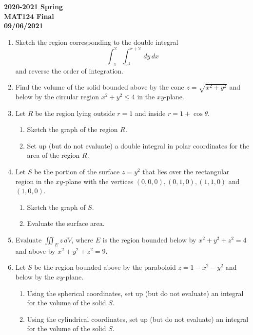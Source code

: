 \documentclass[a4paper, 12pt]{article}
\begin{document}
\newpage
{}
{}

\begin{center}
\textbf{2020-2021 Spring \\MAT124 Final\\09/06/2021}
\end{center}

\begin{enumerate}[leftmargin=*,label=\textbf{\arabic*.}]
\item Sketch the region corresponding to the double integral
\[\int_{-1}^2\int_{x^2}^{x+2}\,dy\,dx\]
and reverse the order of integration.

\item Find the volume of the solid bounded above by the cone $z=\sqrt{x^2+y^2}$ and below by the circular region $x^2+y^2\leq4$ in the $xy$-plane.

\item Let $R$ be the region lying outside $r=1$ and inside $r=1+\cos\theta$.
\begin{enumerate}[leftmargin=*,label=\textbf{\alph*.}]
\item Sketch the graph of the region $R$.
\item Set up (but do not evaluate) a double integral in polar coordinates for the area of the region $R$.
\end{enumerate}

\item Let $S$ be the portion of the surface $z=y^2$ that lies over the rectangular region in the $xy$-plane with the vertices $(0,0,0), (0,1,0), (1,1,0)$ and $(1,0,0)$.
\begin{enumerate}[leftmargin=*,label=\textbf{\alph*.}]
\item Sketch the graph of $S$.
\item Evaluate the surface area.
\end{enumerate}

\item Evaluate $\displaystyle \iiint_E z\,dV$, where $E$ is the region bounded below by $x^2+y^2+z^2=4$ and above by $x^2+y^2+z^2=9$.

\item Let $S$ be the region bounded above by the paraboloid $z=1-x^2-y^2$ and below by the $xy$-plane.
\begin{enumerate}[leftmargin=*,label=\textbf{\alph*.}]
\item Using the spherical coordinates, set up (but do not evaluate) an integral for the volume of the solid $S$.
\item Using the cylindrical coordinates, set up (but do not evaluate) an integral for the volume of the solid $S$.
\end{enumerate}
\end{enumerate}
\end{document}
